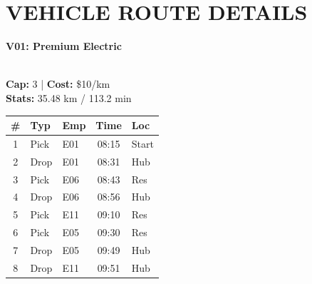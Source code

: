 \documentclass[a4paper,11pt]{article}
\begin{document}
\vspace{0.2cm}

\section*{\uppercase{\color{velorablue} Vehicle Route Details}}
\vspace{-0.2cm}

\noindent
\begin{minipage}[t]{0.32\textwidth}
    \centering
    \colorbox{velorablue}{\parbox{\dimexpr\linewidth-2\fboxsep}{\centering \color{white}\textbf{V01: Premium Electric}}} \\
    \vspace{0.05cm}
    {\scriptsize \textbf{Cap:} 3 | \textbf{Cost:} \$10/km \\ \textbf{Stats:} 35.48 km / 113.2 min}
    \vspace{0.1cm}
    
    \renewcommand{\arraystretch}{1.1}
    \setlength{\tabcolsep}{2pt}
    \scriptsize
    \begin{tabular}{c l l c l}
        \toprule
        \textbf{\#} & \textbf{Typ} & \textbf{Emp} & \textbf{Time} & \textbf{Loc} \\
        \midrule
        1 & Pick & E01 & 08:15 & Start \\
        \rowcolor{headergray} 2 & Drop & E01 & 08:31 & Hub \\
        3 & Pick & E06 & 08:43 & Res \\
        \rowcolor{headergray} 4 & Drop & E06 & 08:56 & Hub \\
        5 & Pick & E11 & 09:10 & Res \\
        \rowcolor{headergray} 6 & Pick & E05 & 09:30 & Res \\
        7 & Drop & E05 & 09:49 & Hub \\
        \rowcolor{headergray} 8 & Drop & E11 & 09:51 & Hub \\
        \bottomrule
    \end{tabular}
\end{minipage}
\hfill
\end{document}
